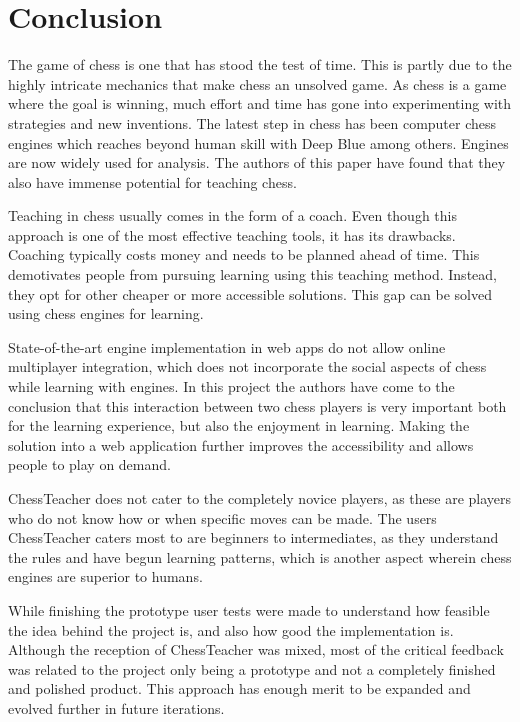 \chapter{Conclusion}\label{ch:conclusion}

The game of chess is one that has stood the test of time.
This is partly due to the highly intricate mechanics that make chess an unsolved game.
As chess is a game where the goal is winning, much effort and time has gone into experimenting with
strategies and new inventions.
The latest step in chess has been computer chess engines which reaches beyond human skill with Deep Blue among others.
Engines are now widely used for analysis.
The authors of this paper have found that they also have immense potential for teaching chess.

Teaching in chess usually comes in the form of a coach.
Even though this approach is one of the most effective teaching tools, it has its drawbacks.
Coaching typically costs money and needs to be planned ahead of time.
This demotivates people from pursuing learning using this teaching method.
Instead, they opt for other cheaper or more accessible solutions.
This gap can be solved using chess engines for learning.

State-of-the-art engine implementation in web apps do not allow online multiplayer integration, which does not
incorporate the social aspects of chess while learning with engines.
In this project the authors have come to the conclusion that this interaction between two chess players is very
important both for the learning experience, but also the enjoyment in learning.
Making the solution into a web application further improves the accessibility and allows people to play on demand.

ChessTeacher does not cater to the completely novice players, as these are players who do not know how or when specific
moves can be made.
The users ChessTeacher caters most to are beginners to intermediates, as they understand the rules and have begun
learning patterns, which is another aspect wherein chess engines are superior to humans.

While finishing the prototype user tests were made to understand how feasible the idea behind the project is, and also
how good the implementation is.
Although the reception of ChessTeacher was mixed, most of the critical feedback was related to the project only being
a prototype and not a completely finished and polished product.
This approach has enough merit to be expanded and evolved further in future iterations.

